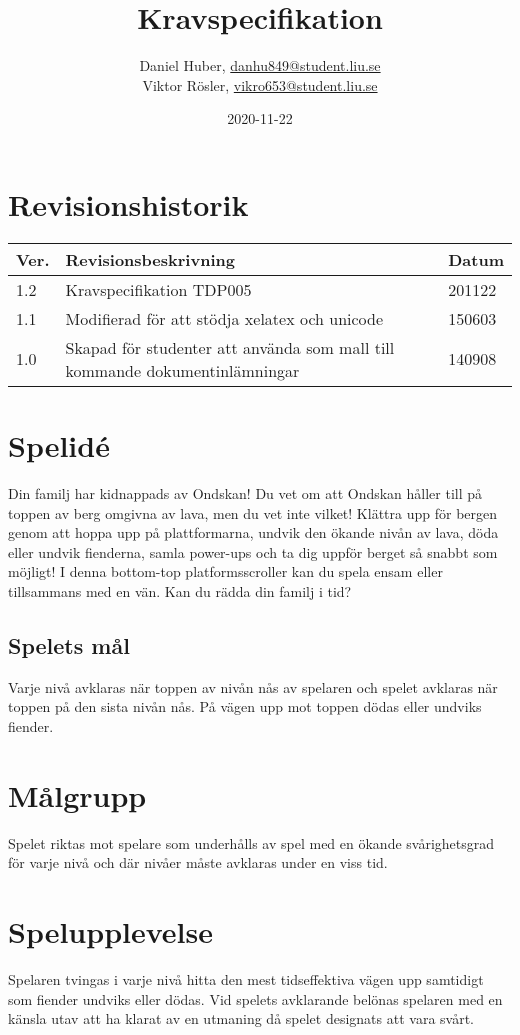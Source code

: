 \documentclass{TDP005mall}
\author{Daniel Huber, \url{danhu849@student.liu.se}\\
  Viktor Rösler, \url{vikro653@student.liu.se}}
\title{Kravspecifikation}
\date{2020-11-22}
\begin{document}
\projectpage
\tableofcontents
\newpage
\section{Revisionshistorik}
\begin{table}[!h]
\begin{tabularx}{\linewidth}{|l|X|l|}
\hline
  Ver. & Revisionsbeskrivning & Datum \\\hline
1.2 & Kravspecifikation TDP005 & 201122 \\\hline
1.1 & Modifierad för att stödja xelatex och unicode & 150603 \\\hline
1.0 & Skapad för studenter att använda som mall till
kommande dokumentinlämningar & 140908 \\\hline
\end{tabularx}
\end{table}


\section{Spelid\'{e} }
Din familj har kidnappads av Ondskan! Du vet om att Ondskan håller till på toppen av berg omgivna av lava, men du vet inte vilket! Klättra upp för bergen genom att hoppa upp på plattformarna, undvik den ökande nivån av lava, döda eller undvik fienderna, samla power-ups och ta dig uppför berget så snabbt som möjligt! I denna bottom-top platformsscroller kan du spela ensam eller tillsammans med en vän. Kan du rädda din familj i tid?

\subsection{Spelets mål}
Varje nivå avklaras när toppen av nivån nås av spelaren och spelet avklaras när toppen på den sista nivån nås. På vägen upp mot toppen dödas eller undviks fiender. 

\section{Målgrupp}%
Spelet riktas mot spelare som underhålls av spel med en ökande svårighetsgrad för varje nivå och där nivåer måste avklaras under en viss tid. 

\section{Spelupplevelse}%
Spelaren tvingas i varje nivå hitta den mest tidseffektiva vägen upp samtidigt som fiender undviks eller dödas. Vid spelets avklarande belönas spelaren med en känsla utav att ha klarat av en utmaning då spelet designats att vara svårt.
\end{document}
